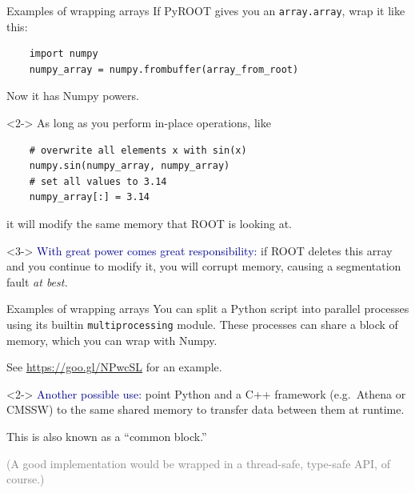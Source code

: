 \documentclass{beamer}
\begin{document}
\begin{frame}[fragile]{Examples of wrapping arrays}
\vspace{0.25 cm}
If PyROOT gives you an {\tt array.array}, wrap it like this:

\small
\begin{verbatim}
    import numpy
    numpy_array = numpy.frombuffer(array_from_root)
\end{verbatim}

\normalsize
Now it has Numpy powers.

\begin{uncoverenv}<2->
\vspace{0.25 cm}
As long as you perform in-place operations, like

\small
\begin{verbatim}
    # overwrite all elements x with sin(x)
    numpy.sin(numpy_array, numpy_array)
    # set all values to 3.14
    numpy_array[:] = 3.14
\end{verbatim}

\normalsize
it will modify the same memory that ROOT is looking at.
\end{uncoverenv}

\begin{uncoverenv}<3->
\vspace{0.25 cm}
\textcolor{darkblue}{With great power comes great responsibility:} if ROOT deletes this array and you continue to modify it, you will corrupt memory, causing a segmentation fault {\it at best.}
\end{uncoverenv}
\end{frame}

\begin{frame}[fragile]{Examples of wrapping arrays}
\vspace{0.25 cm}
You can split a Python script into parallel processes using its builtin {\tt multiprocessing} module. These processes can share a block of memory, which you can wrap with Numpy.

\vspace{0.25 cm}
See \textcolor{blue}{\underline{\url{https://goo.gl/NPwcSL}}} for an example.

\vfill
\begin{uncoverenv}<2->
\textcolor{darkblue}{Another possible use:} point Python and a C++ framework (e.g.\ Athena or CMSSW) to the same shared memory to transfer data between them at runtime.

\vspace{0.25 cm}
This is also known as a ``common block.'' \hspace{0.25 cm}{\tt :)}

\vspace{0.25 cm}
\textcolor{gray}{(A good implementation would be wrapped in a thread-safe, type-safe API, of course.)}
\end{uncoverenv}
\end{frame}
\end{document}

